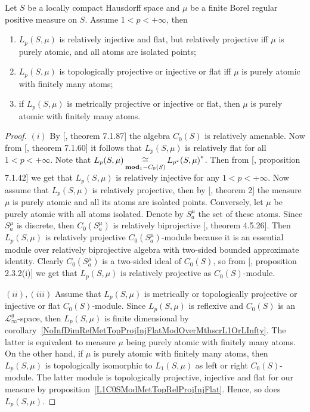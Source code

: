 \begin{proposition}\label{LpC0SModMetTopRelProjIngFlat} Let $S$ be a locally
compact Hausdorff space and $\mu$ be a finite Borel regular positive measure on
$S$. Assume $1<p<+\infty$, then 

\begin{enumerate}[label = (\roman*)]
    \item $L_p(S,\mu)$ is relatively injective and flat, but relatively 
    projective iff $\mu$ is purely atomic, and all atoms are isolated points;

    \item $L_p(S,\mu)$ is topologically projective or injective or flat 
    iff $\mu$ is purely atomic with finitely many atoms;

    \item if $L_p(S,\mu)$ is metrically projective or injective or flat, 
    then $\mu$ is purely atomic with finitely many atoms.
\end{enumerate}
\end{proposition}
\begin{proof} $(i)$ By [\cite{HelBanLocConvAlg}, theorem 7.1.87] the algebra
$C_0(S)$ is relatively amenable. Now from [\cite{HelBanLocConvAlg}, theorem
7.1.60] it follows that $L_p(S,\mu)$ is relatively flat for all $1<p<+\infty$.
Note that $L_p(S,\mu)\mathop{\mathbin{\cong}}\limits_{\mathbf{mod}_1-C_0(S)}{L_{p^*}(S,\mu)}^*$. Then from
[\cite{HelBanLocConvAlg}, proposition 7.1.42] we get that $L_p(S,\mu)$ is
relatively injective for any $1<p<+\infty$. Now assume that $L_p(S,\mu)$ is
relatively projective, then by [\cite{NemRelProjModLp}, theorem 2]
the measure $\mu$ is purely atomic and all its atoms are isolated points.
Conversely, let $\mu$ be purely atomic with all atoms isolated. Denote by
$S_a^{\mu}$ the set of these atoms. Since $S_a^{\mu}$ is discrete, then
$C_0(S_a^{\mu})$ is relatively biprojective [\cite{HelHomolBanTopAlg}, theorem
4.5.26]. Then $L_p(S,\mu)$ is relatively projective $C_0(S_a^{\mu})$-module
because it is an essential module over relatively biprojective algebra with
two-sided bounded approximate identity. Clearly $C_0(S_a^{\mu})$ is a two-sided
ideal of $C_0(S)$, so from [\cite{RamsHomPropSemgroupAlg}, proposition 2.3.2(i)]
we get that $L_p(S,\mu)$ is relatively projective as $C_0(S)$-module.

$(ii), (iii)$ Assume that $L_p(S,\mu)$ is metrically or topologically projective
or injective or flat $C_0(S)$-module. Since $L_p(S,\mu)$ is reflexive and
$C_0(S)$ is an $\mathscr{L}_\infty^g$-space, then $L_p(S,\mu)$ is finite
dimensional by
corollary~\ref{NoInfDimRefMetTopProjInjFlatModOverMthscrL1OrLInfty}. The latter
is equivalent to measure $\mu$ being purely atomic with finitely many atoms. On
the other hand, if $\mu$ is purely atomic with finitely many atoms, then
$L_p(S,\mu)$ is topologically isomorphic to $L_1(S,\mu)$ as left or right
$C_0(S)$-module. The latter module is topologically projective, injective and
flat for our measure by proposition~\ref{L1C0SModMetTopRelProjInjFlat}. Hence, so
does $L_p(S,\mu)$.
\end{proof}

